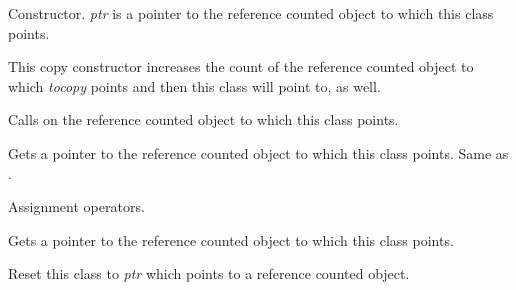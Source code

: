 \label{wxobjectdataptrwxobjectdataptr}


Constructor. {\it ptr} is a pointer to the reference
counted object to which this class points.


This copy constructor increases the count of the reference
counted object to which {\it tocopy} points and then this
class will point to, as well.

\label{wxobjectdataptrdtor}


Calls  on the reference
counted object to which this class points.

\label{wxobjectdataptroperatorpointer}


Gets a pointer to the reference counted object to which
this class points. Same as .

\label{wxobjectdataptroperatorassign}



Assignment operators.

\label{wxobjectdataptrget}


Gets a pointer to the reference counted object to which
this class points.

\label{wxobjectdataptrreset}


Reset this class to {\it ptr} which points to a reference
counted object.
